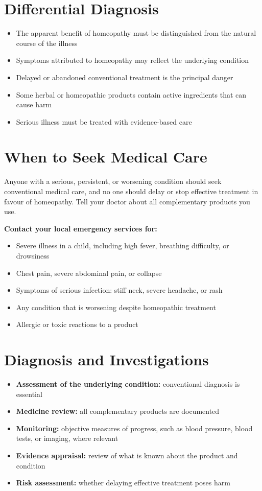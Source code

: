 \section*{Differential Diagnosis}
\begin{itemize}
    \item The apparent benefit of homeopathy must be distinguished from the natural course of the illness
    \item Symptoms attributed to homeopathy may reflect the underlying condition
    \item Delayed or abandoned conventional treatment is the principal danger
    \item Some herbal or homeopathic products contain active ingredients that can cause harm
    \item Serious illness must be treated with evidence-based care
\end{itemize}

\section*{When to Seek Medical Care}
Anyone with a serious, persistent, or worsening condition should seek conventional medical care, and no one should delay or stop effective treatment in favour of homeopathy. Tell your doctor about all complementary products you use.

\textbf{Contact your local emergency services for:}
\begin{itemize}
    \item Severe illness in a child, including high fever, breathing difficulty, or drowsiness
    \item Chest pain, severe abdominal pain, or collapse
    \item Symptoms of serious infection: stiff neck, severe headache, or rash
    \item Any condition that is worsening despite homeopathic treatment
    \item Allergic or toxic reactions to a product
\end{itemize}

\section*{Diagnosis and Investigations}
\begin{itemize}
    \item \textbf{Assessment of the underlying condition:} conventional diagnosis is essential
    \item \textbf{Medicine review:} all complementary products are documented
    \item \textbf{Monitoring:} objective measures of progress, such as blood pressure, blood tests, or imaging, where relevant
    \item \textbf{Evidence appraisal:} review of what is known about the product and condition
    \item \textbf{Risk assessment:} whether delaying effective treatment poses harm
\end{itemize}

